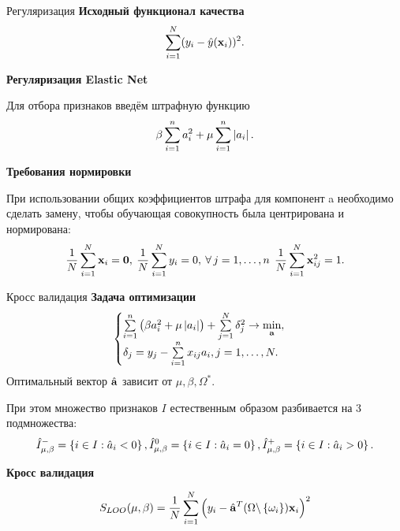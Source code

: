 \documentclass[unicode,lefteqn,c,hyperref={pdfpagelabels=false}]{beamer}
\begin{document}
\begin{frame}{Регуляризация}
	\textbf{Исходный функционал качества}
	\begin{equation*}
		\sum\limits_{i=1}^N(y_i - \hat y(\boldsymbol{\mathbf{x}}_i))^2.
	\end{equation*}

	\smallskip
	\textbf{Регуляризация Elastic Net}

	Для отбора признаков введём штрафную функцию
	\begin{equation*}
		\beta\sum\limits_{i=1}^n a_i^2 + \mu\sum\limits_{i=1}^n\left|a_i\right|.
	\end{equation*}

	\smallskip
	\textbf{Требования нормировки}

	При использовании общих коэффициентов штрафа для компонент \mb a необходимо сделать замену, чтобы обучающая совокупность была центрирована и нормирована:
	\begin{equation*}
		\frac1N\sum\limits_{i=1}^N\boldsymbol{\mathbf{x}}_i = \boldsymbol{\mathbf{0}}, \:
		\frac1N\sum\limits_{i=1}^N y_i = 0, \:
		\forall\,j=1,\ldots, n\: \: \frac1N\sum\limits_{i=1}^N\boldsymbol{\mathbf{x}}_{ij}^2 = 1.
	\end{equation*}
\end{frame}
\def\lams{{\mu,\beta}}
\begin{frame}{Кросс валидация}
	\textbf{Задача оптимизации}
	\begin{equation*}
		\begin{cases}
			\sum\limits_{i=1}^n\left(\beta a_i^2 + \mu \left|a_i\right|\right)
			+ \sum\limits_{j=1}^N \delta_j^2 \to \mathop{\mbox{min}}\limits_{\boldsymbol{\mathbf{a}}}, \\
			\delta_j = y_j - \sum\limits_{i=1}^nx_{ij}a_i, j=1,\ldots,N.
		\end{cases}
	\end{equation*}
	Оптимальный вектор $\hat{\boldsymbol{\mathbf{a}}}$ зависит от $\lams, \Omega^*.$

	При этом множество признаков $I$ естественным образом разбивается на 3 подмножества:
	\begin{equation*}
		\hat I^-_\lams = \fbr{i\in I: \hat a_{i} < 0},
		\hat I^0_\lams = \fbr{i\in I: \hat a_{i} = 0},
		\hat I^+_\lams = \fbr{i\in I: \hat a_{i} > 0}.
	\end{equation*}

	\smallskip
	\textbf{Кросс валидация}

	\begin{equation*}
		S_{LOO}(\lams) = \frac1N\suml_{i=1}^N\cbr{y_i - \hat{\mb a}^T(\Omega \backslash \fbr{\omega_i})\mb x_i}^2
	\end{equation*}
\end{frame}
\end{document}
